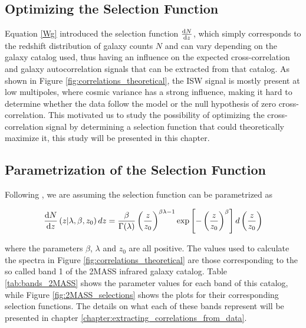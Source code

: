 \documentclass[openany,a4paper,12pt,oneside]{book}
\begin{document}
\begin{spacing}{1.5}
\chapter{Optimizing the Selection Function}\label{chapter:select_func_optimal}

Equation \eqref{Wg} introduced the selection function $\dv{N}{z}$, which simply corresponds to the redshift distribution of galaxy counts $N$ and can vary depending on the galaxy catalog used, thus having an influence on the expected cross-correlation and galaxy autocorrelation signals that can be extracted from that catalog. As shown in Figure \ref{fig:correlations_theoretical}, the ISW signal is mostly present at low multipoles, where cosmic variance has a strong influence, making it hard to determine whether the data follow the model or the null hypothesis of zero cross-correlation. This motivated us to study the possibility of optimizing the cross-correlation signal by determining a selection function that could theoretically maximize it, this study will be presented in this chapter.

\section{Parametrization of the Selection Function}\label{sect:sel_func_par}

Following \cite{cross_corr:Afshordi}, we are assuming the selection function can be parametrized as

\begin{equation}\label{select_func_par}
\dv{N}{z}\left(z|\lambda, \beta, z_0\right)dz=\frac{\beta}{\Gamma(\lambda)}\left(\frac{z}{z_0}\right)^{\beta\lambda-1}\text{exp}\left[-\left(\frac{z}{z_0}\right)^\beta\right]d\left(\frac{z}{z_0}\right)
\end{equation}

\noindent where the parameters $\beta$, $\lambda$ and $z_0$ are all positive. The values used to calculate the spectra in Figure \ref{fig:correlations_theoretical} are those corresponding to the so called band 1 of the 2MASS infrared galaxy catalog. Table \ref{tab:bands_2MASS} shows the parameter values for each band of this catalog, while Figure \ref{fig:2MASS_selections} shows the plots for their corresponding selection functions. The details on what each of these bands represent will be presented in chapter \ref{chapter:extracting_correlations_from_data}.


\end{spacing}
\end{document}
